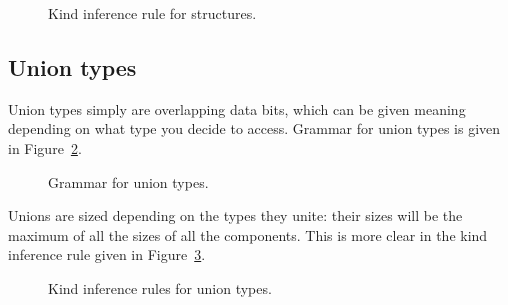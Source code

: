 \begin{figure}[H]
  \centering


  \caption{Kind inference rule for structures.}
  \label{fig:nstar-common-ts-structs-kindrules}
\end{figure}

\subsection{Union types}\label{subsec:nstar-common-ts-unions}

Union types simply are overlapping data bits, which can be given meaning depending on what type you decide to access.
Grammar for union types is given in Figure~\ref{fig:nstar-common-ts-unions-syntax}.

\begin{figure}[htb]
  \centering


  \caption{Grammar for union types.}
  \label{fig:nstar-common-ts-unions-syntax}
\end{figure}

Unions are sized depending on the types they unite: their sizes will be the maximum of all the sizes of all the components.
This is more clear in the kind inference rule given in Figure~\ref{fig:nstar-common-ts-unions-kindrules}.

\begin{figure}[H]
  \centering


  \caption{Kind inference rules for union types.}
  \label{fig:nstar-common-ts-unions-kindrules}
\end{figure}

